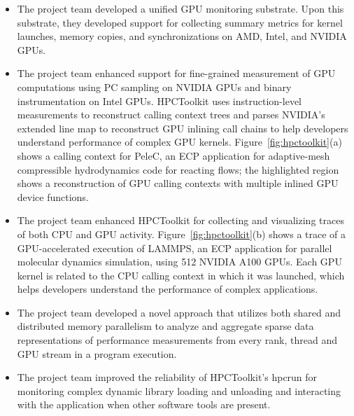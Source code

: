 \begin{itemize}

\item
The project team developed a unified GPU monitoring substrate. Upon this substrate, they developed support for collecting summary metrics for 
kernel launches, memory copies, and synchronizations on AMD, Intel, and NVIDIA GPUs.


\item
The project team enhanced support for fine-grained measurement of GPU computations using PC sampling on NVIDIA GPUs and binary instrumentation on Intel GPUs. 
HPCToolkit uses instruction-level measurements to reconstruct calling context trees and
parses NVIDIA's extended line map to reconstruct GPU inlining call chains to help developers understand performance of complex GPU kernels.
Figure~\ref{fig:hpctoolkit}(a) shows a calling context for PeleC, an ECP application for adaptive-mesh compressible hydrodynamics code for reacting flows; the highlighted region shows a reconstruction of GPU calling contexts with multiple inlined GPU device functions.

\item
The project team enhanced HPCToolkit for collecting and visualizing traces of both CPU and GPU activity.
Figure~\ref{fig:hpctoolkit}(b) shows a trace of a GPU-accelerated execution of LAMMPS, an ECP application for parallel molecular dynamics simulation, using 512 NVIDIA A100 GPUs. Each GPU kernel is related to the CPU calling context in which it was launched, which helps developers understand the performance of complex applications.

\item
The project team developed a novel approach that utilizes both shared and distributed memory parallelism to analyze and aggregate sparse data representations of performance measurements from every rank, thread and GPU stream in a program execution. 

\item 
The project team improved the reliability of HPCToolkit's hpcrun for monitoring complex dynamic library loading and unloading and interacting with the application when other software tools are present.

\end{itemize}

